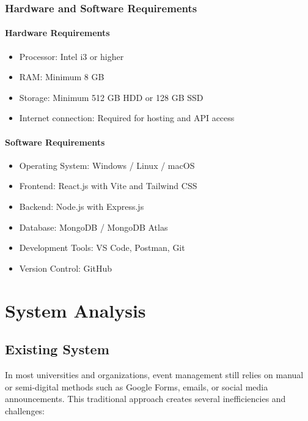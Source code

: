 \documentclass[12pt,a4paper]{report}
\begin{document}
\subsection{Hardware and Software Requirements}

\subsubsection*{Hardware Requirements}
\begin{itemize}
    \item Processor: Intel i3 or higher
    \item RAM: Minimum 8 GB
    \item Storage: Minimum 512 GB HDD or 128 GB SSD
    \item Internet connection: Required for hosting and API access
\end{itemize}

\subsubsection*{Software Requirements}
\begin{itemize}
    \item Operating System: Windows / Linux / macOS
    \item Frontend: React.js with Vite and Tailwind CSS
    \item Backend: Node.js with Express.js
    \item Database: MongoDB / MongoDB Atlas
    \item Development Tools: VS Code, Postman, Git
    \item Version Control: GitHub
\end{itemize}

\chapter{System Analysis}

\section{Existing System}

In most universities and organizations, event management still relies on manual or semi-digital methods such as Google Forms, emails, or social media announcements. This traditional approach creates several inefficiencies and challenges:
\end{document}
